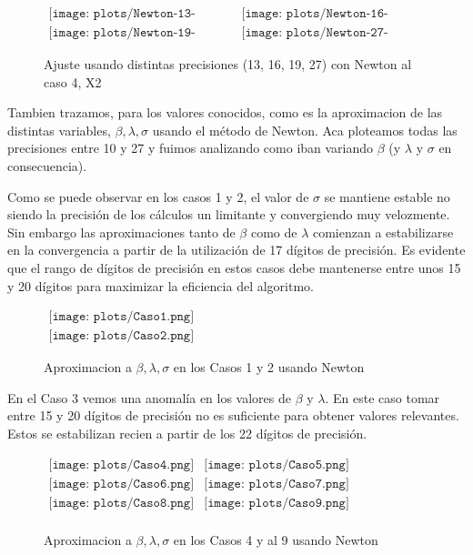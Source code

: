\begin{figure} [H]
$\begin{array}{cc}
\texttt{[image: plots/Newton-13-caso4.png]} &
\texttt{[image: plots/Newton-16-caso4.png]} \\
\texttt{[image: plots/Newton-19-caso4.png]} &
\texttt{[image: plots/Newton-27-caso4.png]}
\end{array}$
\caption{Ajuste usando distintas precisiones (13, 16, 19, 27) con Newton al caso 4, X2}
\label{fig:FitCaso4Newton}
\end{figure}


Tambien trazamos, para los valores conocidos, como es la aproximacion de las distintas variables, $\beta, \lambda, \sigma$ usando el m\'etodo de Newton.
Aca ploteamos todas las precisiones entre 10 y 27 y fuimos analizando como iban variando $\beta$ (y $\lambda$ y $\sigma$ en consecuencia).

Como se puede observar en los casos 1 y 2, el valor de $\sigma$ se mantiene estable no siendo la precisi\'on de los c\'alculos un limitante y convergiendo muy velozmente. Sin embargo las aproximaciones tanto de $\beta$ como de $\lambda$ comienzan a estabilizarse en la convergencia a partir de la utilizaci\'on de 17 d\'igitos de precisi\'on. Es evidente que el rango de d\'igitos de precisi\'on en estos casos debe mantenerse entre unos 15 y 20 d\'igitos para maximizar la eficiencia del algoritmo.  

\begin{figure}
$\begin{array}{c}
\texttt{[image: plots/Caso1.png]} \\
\texttt{[image: plots/Caso2.png]}
\end{array}$

\caption{Aproximacion a $\beta, \lambda, \sigma$ en los Casos 1 y 2 usando Newton}
\end{figure}

En el Caso 3 vemos una anomal\'ia en los valores de $\beta$ y $\lambda$. En este caso tomar entre 15 y 20 d\'igitos de precisi\'on no es suficiente para obtener valores relevantes. Estos se estabilizan recien a partir de los 22 d\'igitos de precisi\'on.




\begin{figure}
$\begin{array}{cc}
\texttt{[image: plots/Caso4.png]} &
\texttt{[image: plots/Caso5.png]} \\
\texttt{[image: plots/Caso6.png]} &
\texttt{[image: plots/Caso7.png]} \\
\texttt{[image: plots/Caso8.png]} &
\texttt{[image: plots/Caso9.png]} \\

\end{array}$

\caption{Aproximacion a $\beta, \lambda, \sigma$ en los Casos 4 y al 9 usando Newton}
\label{fig:AproxCaso1}
\end{figure}


